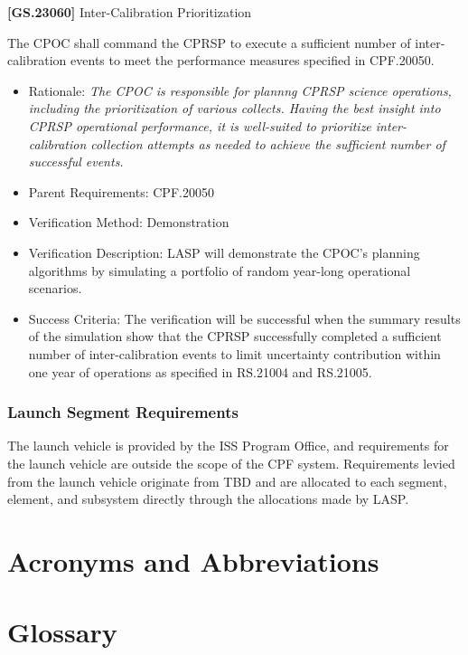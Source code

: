 \documentclass[12pt,oneside,oldfontcommands]{memoir}
\renewcommand{\entryname}{Acronym}
\renewcommand{\descriptionname}{Complete Term}
\begin{document}
\textbf{[GS.23060]} Inter-Calibration Prioritization

The \gls{CPOC} shall command the \gls{CPRSP} to execute a sufficient number of inter-calibration events to meet the performance \gls{measure}s specified in \gls{CPF}.20050.

\begin{itemize}
\item{} Rationale: \emph{The CPOC is responsible for plannng CPRSP science operations, including the prioritization of various collects. Having the best insight into CPRSP operational performance, it is well-suited to prioritize inter-calibration collection attempts as needed to achieve the sufficient number of successful events.}

\item{} Parent Requirements: \gls{CPF}.20050

\item{} Verification Method: Demonstration

\item{} Verification Description: \gls{LASP} will demonstrate the \gls{CPOC}'s planning algorithms by simulating a portfolio of random year-long operational scenarios.

\item{} Success Criteria: The verification will be successful when the summary results of the simulation show that the \gls{CPRSP} successfully completed a sufficient number of inter-calibration events to limit uncertainty contribution within one year of operations as specified in \gls{RS}.21004 and \gls{RS}.21005.

\end{itemize}

\subsection{Launch Segment Requirements}
\label{launchsegmentrequirements}

The launch vehicle is provided by the \gls{ISS} Program Office, and requirements for the launch vehicle are outside the scope of the \gls{CPF} system. Requirements levied from the launch vehicle originate from TBD\label{tbx_2} and are allocated to each segment, element, and subsystem directly through the allocations made by \gls{LASP}.


\begin{appendices}


\chapter{Acronyms and Abbreviations  }
\label{sec_acros}

\printglossary[type=\acronymtype]

\chapter{Glossary  }
\label{sec_gls}


\renewcommand{\entryname}{Term}
\renewcommand{\descriptionname}{Definition}
\printglossary


\end{appendices}
\end{document}

